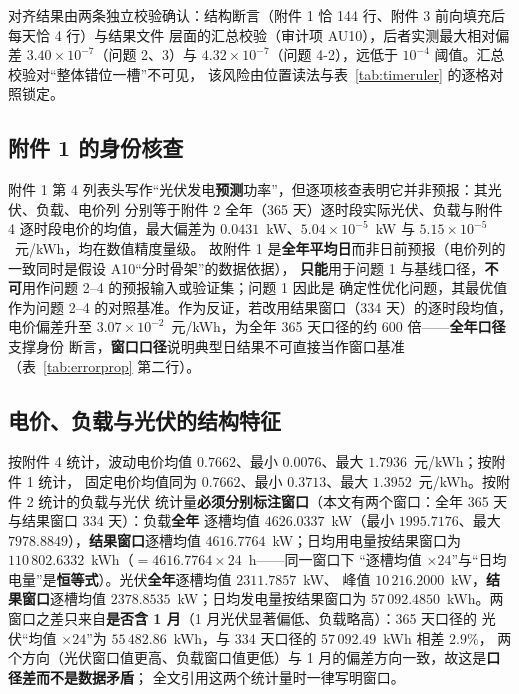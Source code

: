 对齐结果由两条独立校验确认：结构断言（附件 1 恰 144 行、附件 3 前向填充后每天恰 4 行）与结果文件
层面的汇总校验（审计项 AU10），后者实测最大相对偏差 \(3.40\times10^{-7}\)（问题 2、3）与
\(4.32\times10^{-7}\)（问题 4-2），远低于 \(10^{-4}\) 阈值。汇总校验对“整体错位一槽”不可见，
该风险由位置读法与表~\ref{tab:timeruler} 的逐格对照锁定。

\subsection{附件 1 的身份核查}

附件 1 第 4 列表头写作“光伏发电\textbf{预测}功率”，但逐项核查表明它并非预报：其光伏、负载、电价列
分别等于附件 2 全年（365 天）逐时段实际光伏、负载与附件 4 逐时段电价的均值，最大偏差为
\(0.0431\)~kW、\(5.04\times10^{-5}\)~kW 与 \(5.15\times10^{-5}\)~元/kWh，均在数值精度量级。
故附件 1 是\textbf{全年平均日}而非日前预报（电价列的一致同时是假设 A10“分时骨架”的数据依据），
\textbf{只能}用于问题 1 与基线口径，\textbf{不可}用作问题 2--4 的预报输入或验证集；问题 1 因此是
确定性优化问题，其最优值作为问题 2--4 的对照基准。作为反证，若改用结果窗口（334 天）的逐时段均值，
电价偏差升至 \(3.07\times10^{-2}\)~元/kWh，为全年 365 天口径的约 600 倍——\textbf{全年口径}支撑身份
断言，\textbf{窗口口径}说明典型日结果不可直接当作窗口基准（表~\ref{tab:errorprop} 第二行）。

\subsection{电价、负载与光伏的结构特征}

按附件 4 统计，波动电价均值 \(0.7662\)、最小 \(0.0076\)、最大 \(1.7936\)~元/kWh；按附件 1 统计，
固定电价均值同为 \(0.7662\)、最小 \(0.3713\)、最大 \(1.3952\)~元/kWh。按附件 2 统计的负载与光伏
统计量\textbf{必须分别标注窗口}（本文有两个窗口：全年 365 天与结果窗口 334 天）：负载\textbf{全年}
逐槽均值 \(4626.0337\)~kW（最小 \(1995.7176\)、最大 \(7978.8849\)），\textbf{结果窗口}逐槽均值
\(4616.7764\)~kW；日均用电量按结果窗口为 \(110\,802.6332\)~kWh（\(=4616.7764\times24\)~h——同一窗口下
“逐槽均值 \(\times24\)”与“日均电量”是\textbf{恒等式}）。光伏\textbf{全年}逐槽均值 \(2311.7857\)~kW、
峰值 \(10\,216.2000\)~kW，\textbf{结果窗口}逐槽均值 \(2378.8535\)~kW；日均发电量按结果窗口为
\(57\,092.4850\)~kWh。两窗口之差只来自\textbf{是否含 1 月}（1 月光伏显著偏低、负载略高）：365 天口径的
光伏“均值 \(\times24\)”为 \(55\,482.86\)~kWh，与 334 天口径的 \(57\,092.49\)~kWh 相差 \(2.9\%\)，
两个方向（光伏窗口值更高、负载窗口值更低）与 1 月的偏差方向一致，故这是\textbf{口径差而不是数据矛盾}；
全文引用这两个统计量时一律写明窗口。

